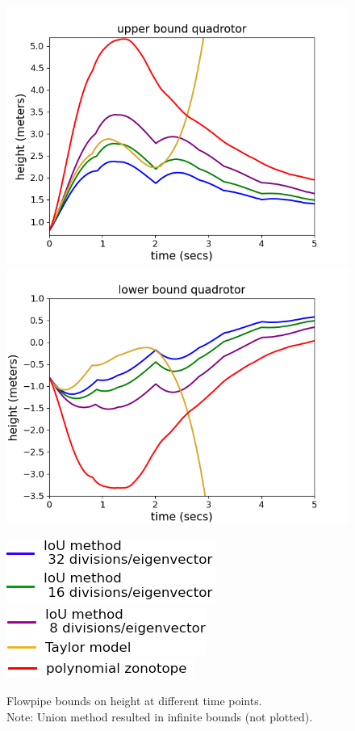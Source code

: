 \begin{figure}
\includegraphics[scale = 0.39]{quadrotorImages/ubToolHeight.png}%
\includegraphics[scale = 0.39]{quadrotorImages/lbToolHeight.png}

\includegraphics[scale = 0.41]{quadrotorImages/leg1.png}~
  \includegraphics[scale = 0.41]{quadrotorImages/leg2.png}~
  \includegraphics[scale = 0.41]{quadrotorImages/leg3.png}
\caption{Flowpipe bounds on height at different time points.\\
Note: Union method resulted in infinite bounds (not plotted).}\label{fig:flowquadrotor}
\end{figure}
% 
